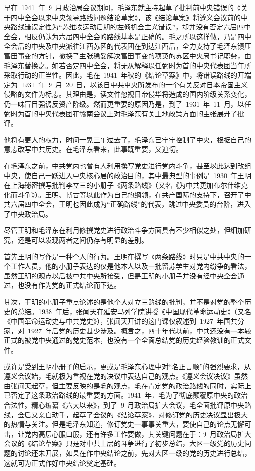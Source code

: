 早在~1941~年~9~月政治局会议期间，毛泽东就主持起草了批判前中央错误的《关于四中全会以来中央领导路线问题结论草案》，该《结论草案》将遵义会议前的中央路线错误定性为“苏维埃运动后期的左倾机会主义错误”，却并没有否定六届四中全会，相反仍认为六届四中全会的路线基本是正确的。毛之所以这样做，乃是四中全会后的中央及中央派往江西苏区的代表团在到达江西后，全力支持了毛泽东镇压富田事变的方针，撤换了主张稳妥解决富田事变的项英的苏区中央局书记职务，由毛泽东替换之。如若否定四中全会，将无从解释以任弼时为首的中央代表团当年所采取行动的正当性。因此，毛在~1941~年秋的《结论草案》中，将错误路线的开端定为~1931~年~9~月~20~日，以该日中共中央所发布的一个有关反对日本帝国主义侵略的文件为标志。其理由是，读文件忽视日帝侵华将造成的国内阶级关系变化，仍一味盲目强调反资产阶级。然而更重要的原因乃是，到了~1931~年~11~月，以任弼时为首的中央代表团在赣南会议上对毛泽东有关土地政策方面的主张展开了批评。

他将有更大的权力，时间一晃三年过去了，毛泽东已牢牢控制了中央，根据自己的意志改写中共历史。在毛泽东看来，此事既重要，又迫切。

在毛泽东之前，中共党内也曾有人利用撰写党史进行党内斗争，甚至以此达到改组中央，使自己一跃进入中央核心层的政治目的，其中最典型的事例是~1930~年王明在上海秘密撰写批判李立三的小册子《两条路线》（又名《为中共更加布尔什维克化而斗争》）。王明、博古等以此作为自己的纲领，在共产国际的支持下，召开了中共六届四中全会，王明也因此成为“正确路线”的代表，跳过中央委员的台阶，进入了中央政治局。

尽管王明和毛泽东在利用修撰党史进行政治斗争方面具有不少相似之处，但细加研究，还是可以发现两者之间仍存有明显的差别。

首先王明的写作是一种个人的行为。王明在撰写《两条路线》时只是中共中央的一个工作人员，他的小册子表达的仅是他本人以及一批留苏学生对党内纷争的看法，虽然王明的观点以后被中共中央所接受，但是王明的小册子并没有经中央全会通过，也没有作为党的正式结论而下达。

其次，王明的小册子重点论述的是他个人对立三路线的批判，并不是对党的整个历史的总结。1938~年后，张闻天在延安马列学院讲授《中国现代革命运动史》（又名《中国革命运动史与中共党史》），张闻天开讲的这门课仅叙述到~1927~年国共分家，对~1927~年后党的历史甚少涉及。概言之，四十年代以前，中共还没有一本较正式的被党中央通过的党史范本，也没有一个全面总结党的历史经验教训的正式文件。

或许是受到王明小册子的启示，更或是毛泽东心理中对“名正言顺”的强烈要求，从遵义会议始，毛就极为重视在党的决议中表达自己的观点。《遵义会议决议》虽然由张闻天起草，但主要反映的是毛的观点，毛在肯定党的政治路线的同时，实际上已否定了这条政治路线的最重要的方面。1941~年，毛为了彻底颠覆原中央的政治合法性。精心编纂《六大以来》，到了~9~月政治局扩大会议，毛全面批评原中央路线，会后又亲自动手，起草了会议的《结论草案》，对修订党的历史决议显出极大的热情与关注。但是毛泽东知道，修订党史一事事关重大，要使自己的论点无懈可击，让党内高层心服口服，还有许多工作要做，其关键问题在于：9~月政治局扩大会议的《结论草案》只是对中共上层的斗争进行了初步总结，大区一级党的历史问题的讨论还未开展，如果在作中央结论之前，先对大区一级的党的历史进行总结，这就可为正式作好中央结论奠定基础。

